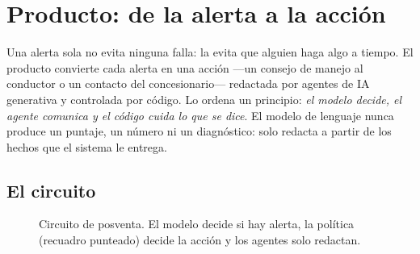 \section{Producto: de la alerta a la acción}
\label{sec:producto}

Una alerta sola no evita ninguna falla: la evita que alguien haga algo a tiempo. El producto convierte cada alerta en una
acción ---un consejo de manejo al conductor o un contacto del concesionario--- redactada por agentes de IA generativa y
controlada por código. Lo ordena un principio: \emph{el modelo decide, el agente comunica y el código cuida lo que se dice}.
El modelo de lenguaje nunca produce un puntaje, un número ni un diagnóstico: solo redacta a partir de los hechos que el
sistema le entrega.

\subsection{El circuito}

\begin{figure}[!htbp]
\centering
{}
\caption{Circuito de posventa. El modelo decide si hay alerta, la política (recuadro punteado) decide la acción y los
agentes solo redactan.}
\label{fig:circuito}
\end{figure}

